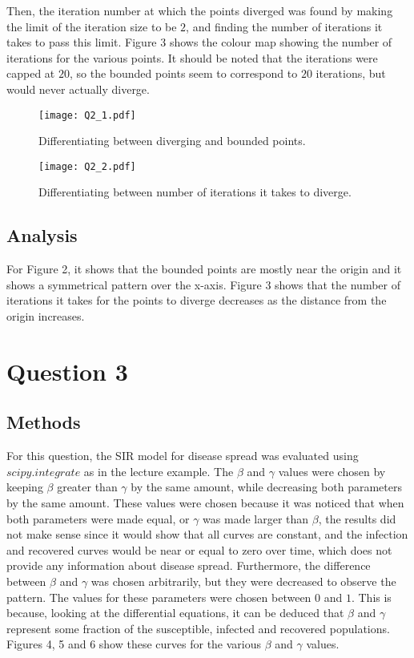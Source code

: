 \documentclass[12pt]{article}
\begin{document}
Then, the iteration number at which the points diverged was found by making the limit of the iteration size to be $2$, and finding the number of iterations it takes to pass this limit. Figure 3 shows the colour map showing the number of iterations for the various points. It should be noted that the iterations were capped at $20$, so the bounded points seem to correspond to $20$ iterations, but would never actually diverge.

\begin{figure}[h]
\begin{center}
\texttt{[image: Q2\_1.pdf]}
\caption{Differentiating between diverging and bounded points.}
\end{center}
\end{figure}
\begin{figure}[h]
\begin{center}
\texttt{[image: Q2\_2.pdf]}
\caption{Differentiating between number of iterations it takes to diverge.}
\end{center}
\end{figure}

\subsection{Analysis}
For Figure 2, it shows that the bounded points are mostly near the origin and it shows a symmetrical pattern over the x-axis. Figure 3 shows that the number of iterations it takes for the points to diverge decreases as the distance from the origin increases.

\section{Question 3}
\subsection{Methods}
For this question, the SIR model for disease spread was evaluated using $scipy.integrate$ as in the lecture example. The $\beta$ and $\gamma$ values were chosen by keeping $\beta$ greater than $\gamma$ by the same amount, while decreasing both parameters by the same amount. These values were chosen because it was noticed that when both parameters were made equal, or $\gamma$ was made larger than $\beta$, the results did not make sense since it would show that all curves are constant, and the infection and recovered curves would be near or equal to zero over time, which does not provide any information about disease spread. Furthermore, the difference between $\beta$ and $\gamma$  was chosen arbitrarily, but they were decreased to observe the pattern. The values for these parameters were chosen between $0$ and $1$. This is because, looking at the differential equations, it can be deduced that $\beta$ and $\gamma$ represent some fraction of the susceptible, infected and recovered populations. Figures 4, 5 and 6 show these curves for the various $\beta$ and $\gamma$ values.
\end{document}
